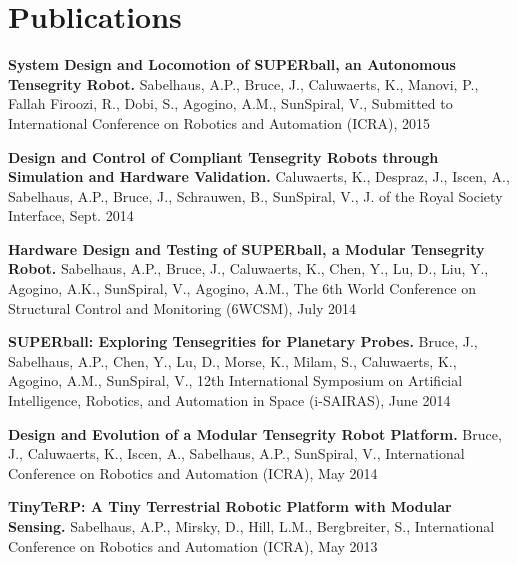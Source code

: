 \documentclass[letterpaper]{deedy-resume} %
\begin{document}
\begin{minipage}[t]{0.60\textwidth}%


\section{Publications}

\vspace{0.4cm}

\begin{tightitemize}

\item \textbf{System Design and Locomotion of SUPERball, an Autonomous Tensegrity Robot.} Sabelhaus, A.P., Bruce, J., Caluwaerts, K., Manovi, P., Fallah Firoozi, R., Dobi, S., Agogino, A.M., SunSpiral, V., Submitted to International Conference on Robotics and Automation (ICRA), 2015

\item \textbf{Design and Control of Compliant Tensegrity Robots through Simulation and Hardware Validation.} Caluwaerts, K., Despraz, J., Iscen, A., Sabelhaus, A.P., Bruce, J., Schrauwen, B., SunSpiral, V.,  J. of the Royal Society Interface, Sept. 2014

\item \textbf{Hardware Design and Testing of SUPERball, a Modular Tensegrity Robot.} Sabelhaus, A.P., Bruce, J., Caluwaerts, K., Chen, Y., Lu, D., Liu, Y., Agogino, A.K., SunSpiral, V., Agogino, A.M., The 6th World Conference on Structural Control and Monitoring (6WCSM), July 2014

\item \textbf{SUPERball: Exploring Tensegrities for Planetary Probes.} Bruce, J., Sabelhaus, A.P., Chen, Y., Lu, D., Morse, K., Milam, S., Caluwaerts, K., Agogino, A.M., SunSpiral, V., 12th International Symposium on Artificial Intelligence, Robotics, and Automation in Space (i-SAIRAS), June 2014

\item \textbf{Design and Evolution of a Modular Tensegrity Robot Platform.} Bruce, J., Caluwaerts, K., Iscen, A., Sabelhaus, A.P., SunSpiral, V., International Conference on Robotics and Automation (ICRA), May 2014

\item \textbf{TinyTeRP: A Tiny Terrestrial Robotic Platform with Modular Sensing.} Sabelhaus, A.P., Mirsky, D., Hill, L.M., Bergbreiter, S., International Conference on Robotics and Automation (ICRA), May 2013 


\end{tightitemize}
\end{minipage}
\end{document}

